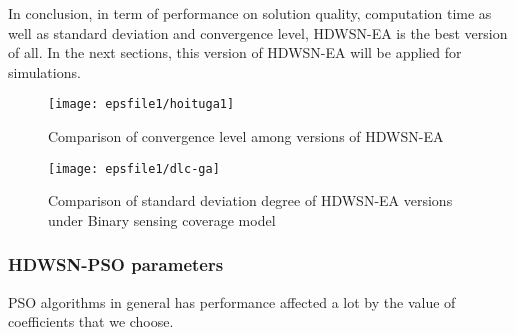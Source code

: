\documentclass[final]{elsarticle}
\begin{document}
In conclusion, in term of performance on solution quality, computation time as well as standard deviation and convergence level, HDWSN-EA is the best version of all. In the next sections, this version of HDWSN-EA will be applied for simulations.
\begin{figure*}[h]
	\texttt{[image: epsfile1/hoituga1]}
	\centering	\caption{Comparison of convergence level among versions of HDWSN-EA}
	\label{Fig.10}       %
\end{figure*}
\begin{figure*}[h]
	\texttt{[image: epsfile1/dlc-ga]}
	\centering	\caption{Comparison of standard deviation degree of HDWSN-EA versions under Binary sensing coverage model}
	\label{Fig.12}       %
\end{figure*}
\subsubsection{HDWSN-PSO parameters}
PSO algorithms in general has performance affected a lot by the value of coefficients that we choose.
\end{document}
